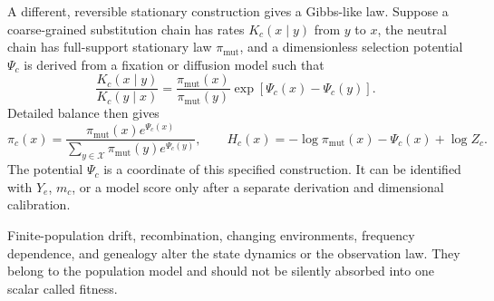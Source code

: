 A different, reversible stationary construction gives a Gibbs-like law.  Suppose a coarse-grained
substitution chain has rates $K_c(x\mid y)$ from $y$ to $x$, the neutral chain has full-support
stationary law $\pi_{\mathrm{mut}}$, and a dimensionless selection potential $\Psi_c$ is derived
from a fixation or diffusion model such that
\begin{equation}
\frac{K_c(x\mid y)}{K_c(y\mid x)}
=\frac{\pi_{\mathrm{mut}}(x)}{\pi_{\mathrm{mut}}(y)}
\exp\!\left[\Psi_c(x)-\Psi_c(y)\right].
\label{eq:book-selection-local-detailed-balance}
\end{equation}
Detailed balance then gives
\begin{equation}
\pi_c(x)=
\frac{\pi_{\mathrm{mut}}(x)e^{\Psi_c(x)}}
{\sum_{y\in\mathcal X}\pi_{\mathrm{mut}}(y)e^{\Psi_c(y)}},
\qquad
H_c(x)=-\log\pi_{\mathrm{mut}}(x)-\Psi_c(x)+\log Z_c.
\label{eq:book-reversible-selection-law}
\end{equation}
The potential $\Psi_c$ is a coordinate of this specified construction.  It can be identified with
$Y_e$, $m_c$, or a model score only after a separate derivation and dimensional calibration.

Finite-population drift, recombination, changing environments, frequency dependence, and genealogy
alter the state dynamics or the observation law.  They belong to the population model and should not
be silently absorbed into one scalar called fitness.
